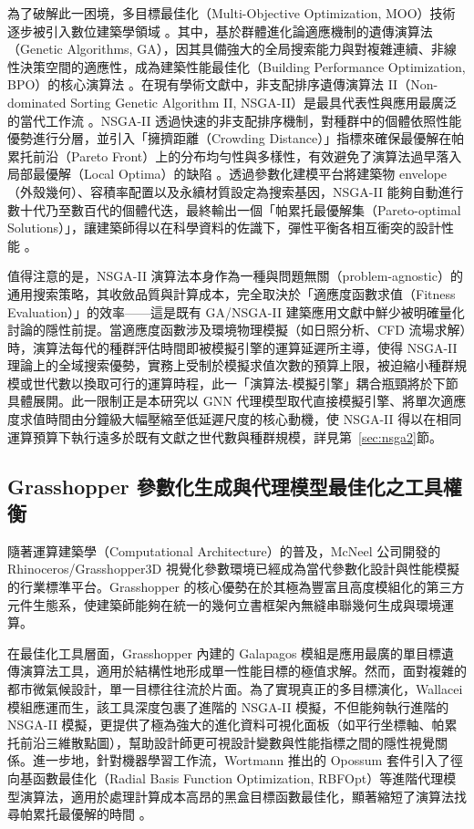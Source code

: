 為了破解此一困境，多目標最佳化（Multi-Objective Optimization, MOO）技術逐步被引入數位建築學領域 \citep{westermann2019surrogate}。其中，基於群體進化論適應機制的遺傳演算法（Genetic Algorithms, GA），因其具備強大的全局搜索能力與對複雜連續、非線性決策空間的適應性，成為建築性能最佳化（Building Performance Optimization, BPO）的核心演算法 \citep{wang2005object}。在現有學術文獻中，非支配排序遺傳演算法 II（Non-dominated Sorting Genetic Algorithm II, NSGA-II）是最具代表性與應用最廣泛的當代工作流 \citep{deb2002fast}。NSGA-II 透過快速的非支配排序機制，對種群中的個體依照性能優勢進行分層，並引入「擁擠距離（Crowding Distance）」指標來確保最優解在帕累托前沿（Pareto Front）上的分布均勻性與多樣性，有效避免了演算法過早落入局部最優解（Local Optima）的缺陷 \citep{deb2002fast,daglier2025developing}。透過參數化建模平台將建築物 envelope（外殼幾何）、容積率配置以及永續材質設定為搜索基因，NSGA-II 能夠自動進行數十代乃至數百代的個體代迭，最終輸出一個「帕累托最優解集（Pareto-optimal Solutions）」，讓建築師得以在科學資料的佐識下，彈性平衡各相互衝突的設計性能 \citep{cheng2023urbangenogan,daglier2025developing}。

值得注意的是，NSGA-II 演算法本身作為一種與問題無關（problem-agnostic）的通用搜索策略，其收斂品質與計算成本，完全取決於「適應度函數求值（Fitness Evaluation）」的效率——這是既有 GA/NSGA-II 建築應用文獻中鮮少被明確量化討論的隱性前提。當適應度函數涉及環境物理模擬（如日照分析、CFD 流場求解）時，演算法每代的種群評估時間即被模擬引擎的運算延遲所主導，使得 NSGA-II 理論上的全域搜索優勢，實務上受制於模擬求值次數的預算上限，被迫縮小種群規模或世代數以換取可行的運算時程，此一「演算法-模擬引擎」耦合瓶頸將於下節具體展開。此一限制正是本研究以 GNN 代理模型取代直接模擬引擎、將單次適應度求值時間由分鐘級大幅壓縮至低延遲尺度的核心動機，使 NSGA-II 得以在相同運算預算下執行遠多於既有文獻之世代數與種群規模，詳見第~\ref{sec:nsga2}節。


\subsection{Grasshopper 參數化生成與代理模型最佳化之工具權衡}
\label{subsec:gh_surrogate}

隨著運算建築學（Computational Architecture）的普及，McNeel 公司開發的 Rhinoceros/Grasshopper3D 視覺化參數環境已經成為當代參數化設計與性能模擬的行業標準平台。Grasshopper 的核心優勢在於其極為豐富且高度模組化的第三方元件生態系，使建築師能夠在統一的幾何立書框架內無縫串聯幾何生成與環境運算。

在最佳化工具層面，Grasshopper 內建的 Galapagos 模組是應用最廣的單目標遺傳演算法工具，適用於結構性地形成單一性能目標的極值求解。然而，面對複雜的都市微氣候設計，單一目標往往流於片面。為了實現真正的多目標演化，Wallacei 模組應運而生，該工具深度包裹了進階的 NSGA-II 模擬，不但能夠執行進階的 NSGA-II 模擬，更提供了極為強大的進化資料可視化面板（如平行坐標軸、帕累托前沿三維散點圖），幫助設計師更可視設計變數與性能指標之間的隱性視覺關係。進一步地，針對機器學習工作流，Wortmann 推出的 Opossum 套件引入了徑向基函數最佳化（Radial Basis Function Optimization, RBFOpt）等進階代理模型演算法，適用於處理計算成本高昂的黑盒目標函數最佳化，顯著縮短了演算法找尋帕累托最優解的時間 \citep{wortmann2017opossum,daglier2025developing}。

